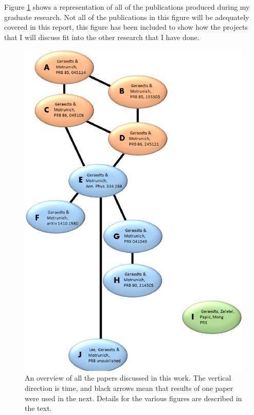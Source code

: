 Figure \ref{papers} shows a representation of all of the publications produced during my graduate research. Not all of the publications in this figure will be adequately covered in this report, this figure has been included to show how the projects that I will discuss fit into the other research that I have done. 

\begin{figure}
\includegraphics[width=\linewidth]{figures/publications.eps}
\caption{ An overview of all the papers discussed in this work. The vertical direction is time, and black arrows mean that results of one paper were used in the next. Details for the various figures are described in the text.
\label{papers}}
\end{figure}

